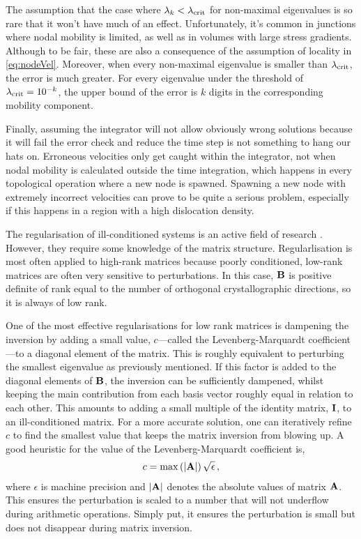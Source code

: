 The assumption that the case where $\lambda_k < \lambda_{\textrm{crit}}$ for non-maximal eigenvalues is so rare that it won't have much of an effect. Unfortunately, it's common in junctions where nodal mobility is limited, as well as in volumes with large stress gradients. Although to be fair, these are also a consequence of the assumption of locality in \cref{eq:nodeVel}. Moreover, when every non-maximal eigenvalue is smaller than $\lambda_{\textrm{crit}}$, the error is much greater. For every eigenvalue under the threshold of $\lambda_{\textrm{crit}} = 10^{-k}$, the upper bound of the error is $k$ digits in the corresponding mobility component.

Finally, assuming the integrator will not allow obviously wrong solutions because it will fail the error check and reduce the time step is not something to hang our hats on. Erroneous velocities only get caught within the integrator, not when nodal mobility is calculated outside the time integration, which happens in every topological operation where a new node is spawned. Spawning a new node with extremely incorrect velocities can prove to be quite a serious problem, especially if this happens in a region with a high dislocation density.

The regularisation of ill-conditioned systems is an active field of research \cite{regularisation1,regularisation2,regularisation3}. However, they require some knowledge of the matrix structure. Regularlisation is most often applied to high-rank matrices because poorly conditioned, low-rank matrices are often very sensitive to perturbations. In this case, $\mathbf{B}$ is positive definite of rank equal to the number of orthogonal crystallographic directions, so it is always of low rank.

One of the most effective regularisations for low rank matrices is dampening the inversion by adding a small value, $c$---called the Levenberg-Marquardt coefficient---to a diagonal element of the matrix. This is roughly equivalent to perturbing the smallest eigenvalue as previously mentioned. If this factor is added to the diagonal elements of $\mathbf{B}$, the inversion can be sufficiently dampened, whilst keeping the main contribution from each basis vector roughly equal in relation to each other. This amounts to adding a small multiple of the identity matrix, $\mathbf{I}$, to an ill-conditioned matrix. For a more accurate solution, one can iteratively refine $c$ to find the smallest value that keeps the matrix inversion from blowing up. A good heuristic for the value of the Levenberg-Marquardt coefficient is,
\begin{align}\label{eq:marquardt}
  c = \max\left(\lvert\mathbf{A}\rvert\right) \sqrt{\epsilon}\,,
\end{align}
where $\epsilon$ is machine precision and $\lvert \mathbf{A}\rvert$ denotes the absolute values of matrix $\mathbf{A}$. This ensures the perturbation is scaled to a number that will not underflow during arithmetic operations. Simply put, it ensures the perturbation is small but does not disappear during matrix inversion.


